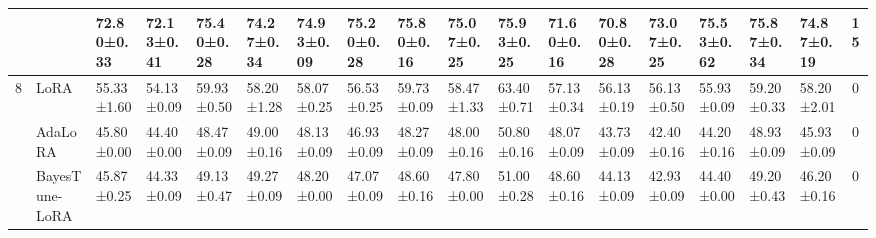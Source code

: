 \begin{table*}[t]
\begin{scriptsize}
{\begin{tabular}{c|l|l|l|l|l|l|l|l|l|l|l|l|l|l|l|l|c}
                    & \method{}                                 & \textbf{72.80±0.33}               & \textbf{72.13±0.41}              & \textbf{75.40±0.28}               & \textbf{74.27±0.34}              & \textbf{74.93±0.09}              & \textbf{75.20±0.28}               & \textbf{75.80±0.16}               & \textbf{75.07±0.25}              & \textbf{75.93±0.25}              & \textbf{71.60±0.16}               & \textbf{70.80±0.28}               & \textbf{73.07±0.25}              & \textbf{75.53±0.62}              & \textbf{75.87±0.34}              & \textbf{74.87±0.19}              & \textbf{15}   \\ \hline
\multirow{5}{*}{8}  & LoRA                                   & 55.33±1.60                       & 54.13±0.09                       & 59.93±0.50                       & 58.20±1.28                        & 58.07±0.25                       & 56.53±0.25                       & 59.73±0.09                       & 58.47±1.33                       & 63.40±0.71                        & 57.13±0.34                       & 56.13±0.19                       & 56.13±0.50                       & 55.93±0.09                       & 59.20±0.33                        & 58.20±2.01                        & 0             \\ %
                    & AdaLoRA                              & 45.80±0.00                        & 44.40±0.00                        & 48.47±0.09                       & 49.00±0.16                        & 48.13±0.09                       & 46.93±0.09                       & 48.27±0.09                       & 48.00±0.16                        & 50.80±0.16                        & 48.07±0.09                       & 43.73±0.09                       & 42.40±0.16                        & 44.20±0.16                        & 48.93±0.09                       & 45.93±0.09                       & 0             \\ %
                    & BayesTune-LoRA                            & 45.87±0.25                       & 44.33±0.09                       & 49.13±0.47                       & 49.27±0.09                       & 48.20±0.00                        & 47.07±0.09                       & 48.60±0.16                        & 47.80±0.00                        & 51.00±0.28                        & 48.60±0.16                        & 44.13±0.09                       & 42.93±0.09                       & 44.40±0.00                        & 49.20±0.43                        & 46.20±0.16                        & 0             \\ %

\end{tabular}}
\end{scriptsize}
\end{table*}
